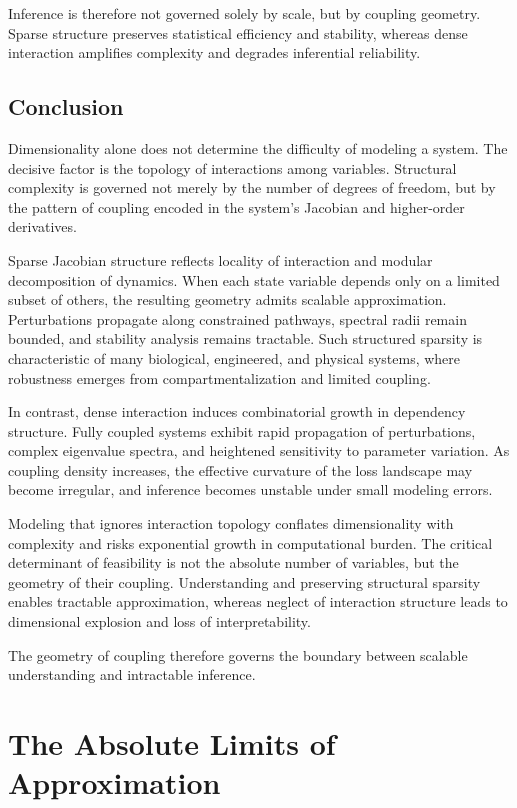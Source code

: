 \documentclass[12pt]{book}
\begin{document}
Inference is therefore not governed solely by scale, but by coupling geometry. Sparse structure preserves statistical efficiency and stability, whereas dense interaction amplifies complexity and degrades inferential reliability.

\section{Conclusion}

Dimensionality alone does not determine the difficulty of modeling a system. The decisive factor is the topology of interactions among variables. Structural complexity is governed not merely by the number of degrees of freedom, but by the pattern of coupling encoded in the system's Jacobian and higher-order derivatives.

Sparse Jacobian structure reflects locality of interaction and modular decomposition of dynamics. When each state variable depends only on a limited subset of others, the resulting geometry admits scalable approximation. Perturbations propagate along constrained pathways, spectral radii remain bounded, and stability analysis remains tractable. Such structured sparsity is characteristic of many biological, engineered, and physical systems, where robustness emerges from compartmentalization and limited coupling.

In contrast, dense interaction induces combinatorial growth in dependency structure. Fully coupled systems exhibit rapid propagation of perturbations, complex eigenvalue spectra, and heightened sensitivity to parameter variation. As coupling density increases, the effective curvature of the loss landscape may become irregular, and inference becomes unstable under small modeling errors.

Modeling that ignores interaction topology conflates dimensionality with complexity and risks exponential growth in computational burden. The critical determinant of feasibility is not the absolute number of variables, but the geometry of their coupling. Understanding and preserving structural sparsity enables tractable approximation, whereas neglect of interaction structure leads to dimensional explosion and loss of interpretability.

The geometry of coupling therefore governs the boundary between scalable understanding and intractable inference.

\chapter{The Absolute Limits of Approximation}
\end{document}
